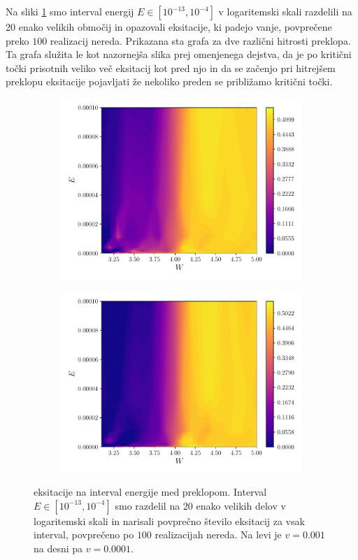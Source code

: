 Na sliki \ref{fig:EksBini} smo interval energij $E \in [10^{-13},10^{-4}]$ v logaritemski skali razdelili na 20 enako velikih območij in opazovali eksitacije, ki padejo vanje, povprečene preko $100$ realizacij nereda. Prikazana sta grafa za dve različni hitrosti preklopa. Ta grafa služita le kot nazornejša slika prej omenjenega dejstva, da je po kritični točki prisotnih veliko več eksitacij kot pred njo in da se začenjo pri hitrejšem preklopu eksitacije pojavljati že nekoliko preden se približamo kritični točki.
\begin{figure}[H]
\centering
\begin{subfigure}{.49\textwidth}
\includegraphics[width=\linewidth]{Figures/EksBini1.pdf}
\end{subfigure}
\begin{subfigure}{.49\textwidth}
\includegraphics[width=\linewidth]{Figures/EksBini2.pdf}
\end{subfigure}
\caption{eksitacije na interval energije med preklopom. Interval $E \in [10^{-13},10^{-4}]$ smo razdelil na 20 enako velikih delov v logaritemski skali in narisali povprečno število eksitacij za vsak interval, povprečeno po $100$ realizacijah nereda. Na levi je $v=0.001$ na desni pa $v=0.0001$.}
\label{fig:EksBini}
\end{figure}
